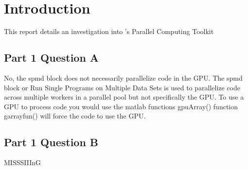 \section{Introduction}
This report details an investigation into \MATLAB's Parallel Computing Toolkit

\subsection{Part 1 Question A}
No, the spmd block does not necessarily parallelize code in the GPU.
The spmd block or Run Single Programs on Multiple Data Sets is used to parallelize code across multiple workers in a parallel pool but not specifically the GPU. To use a GPU to process code you would use the matlab functions gpuArray() function garrayfun() will force the code to use the GPU.

\subsection{Part 1 Question B}
MISSSIIInG